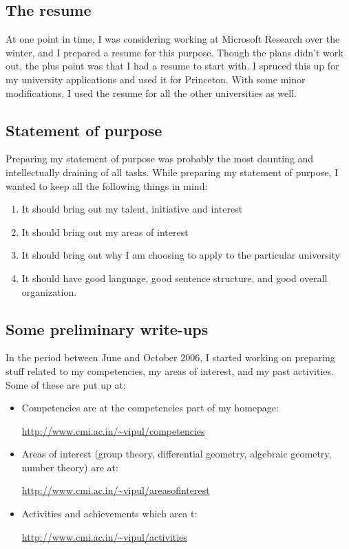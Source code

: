 \documentclass[a4paper]{amsart}
\begin{document}
\subsection{The resume}

At one point in time, I was considering working at Microsoft Research
over the winter, and I prepared a resume for this purpose. Though the plans
didn't work out, the plus point was that I had a resume to start with.
I spruced this up for my university applications and used it for Princeton.
With some minor modifications, I used the resume for all the other
universities as well.

\subsection{Statement of purpose}

Preparing my statement of purpose was probably the most daunting and
intellectually draining of all tasks. While preparing my statement of purpose,
I wanted to keep all the following things in mind:

\begin{enumerate}

\item It should bring out my talent, initiative and interest

\item It should bring out my areas of interest

\item It should bring out why I am choosing to apply to the particular
  university

\item It should have good language, good sentence structure, and good
  overall organization.

\end{enumerate}

\subsection{Some preliminary write-ups}

In the period between June and October 2006, I started working 
on preparing stuff related to my competencies, my areas of interest,
and my past activities. Some of these are put up at:

\begin{itemize}

\item Competencies are at the competencies part of my homepage:

  \url{http://www.cmi.ac.in/~vipul/competencies}

\item Areas of interest (group theory, differential geometry, algebraic
  geometry, number theory) are at:

  \url{http://www.cmi.ac.in/~vipul/areasofinterest}

\item Activities and achievements which area t:

  \url{http://www.cmi.ac.in/~vipul/activities}

\end{itemize}
\end{document}
